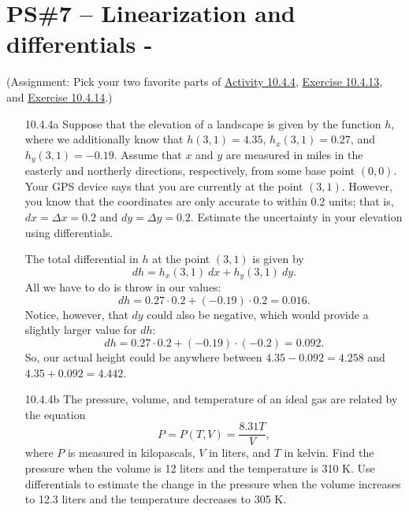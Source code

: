 


%


\allowdisplaybreaks
\section{PS\#7 -- Linearization and differentials -  }

(Assignment: Pick your two favorite parts of \href{https://activecalculus.org/vector/S-10-4-Linearization.html#A_10_4_12}{Activity 10.4.4}, \href{ 
https://activecalculus.org/multi/S-10-4-Linearization.html#Ez_10_4_2}{Exercise 10.4.13}, and  \href{https://activecalculus.org/vector/S-10-4-Linearization.html#Ez_10_4_3}{Exercise 10.4.14}.)

\begin{enumerate}[leftmargin=0pt]
    \item[10.4.4a] Suppose that the elevation of a landscape is given by the function $h$, where we additionally know that $h(3,1) = 4.35$, $h_x(3, 1) = 0.27$, and $h_y(3, 1) = -0.19$. Assume that $x$ and $y$ are measured in miles in the easterly and northerly directions, respectively, from some base point $(0, 0)$. Your GPS device says that you are currently at the point $(3, 1)$. However, you know that the coordinates are only accurate to within $0.2$ units; that is, $dx = \Delta x = 0.2$ and $dy = \Delta y = 0.2$. Estimate the uncertainty in your elevation using differentials.
    
    \begin{red}
    The total differential in $h$ at the point $(3, 1)$ is given by
    \[dh = h_x(3, 1)\ dx + h_y(3, 1)\ dy.\]
    All we have to do is throw in our values:
    \[dh = 0.27 \cdot 0.2 + (-0.19)\cdot 0.2 = 0.016.\]
    Notice, however, that $dy$ could also be negative, which would provide a slightly larger value for $dh$:
    \[dh = 0.27 \cdot 0.2 + (-0.19)\cdot (-0.2) = 0.092.\]
    So, our actual height could be anywhere between $4.35-0.092 = 4.258$ and $4.35 + 0.092 = 4.442$.
    \end{red}
    
    \item[10.4.4b] The pressure, volume, and temperature of an ideal gas are related by the equation \[P=P(T,V)=\frac{8.31T}{V},\] where $P$ is measured in kilopascals, $V$ in liters, and $T$ in kelvin. Find the pressure when the volume is 12 liters and the temperature is 310 K. Use differentials to estimate the change in the pressure when the volume increases to 12.3 liters and the temperature decreases to 305 K.
    

\end{enumerate}

